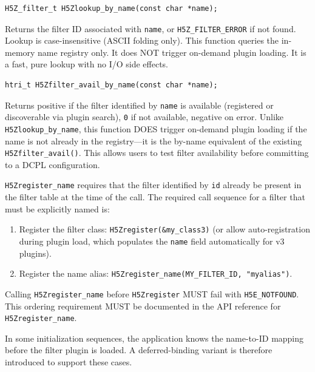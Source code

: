 \documentclass[../HDF5_RFC.tex]{subfiles}
\begin{document}
\begin{verbatim}
H5Z_filter_t H5Zlookup_by_name(const char *name);
\end{verbatim}

Returns the filter ID associated with \texttt{name}, or \texttt{H5Z\_FILTER\_ERROR} if not
found. Lookup is case-insensitive (ASCII folding only). This function queries
the in-memory name registry only. It does NOT trigger on-demand plugin
loading. It is a fast, pure lookup with no I/O side effects.

\begin{verbatim}
htri_t H5Zfilter_avail_by_name(const char *name);
\end{verbatim}

Returns positive if the filter identified by \texttt{name} is available (registered
or discoverable via plugin search), \texttt{0} if not available, negative on error.
Unlike \texttt{H5Zlookup\_by\_name}, this function DOES trigger on-demand plugin
loading if the name is not already in the registry---it is the by-name
equivalent of the existing \texttt{H5Zfilter\_avail()}. This allows users to test
filter availability before committing to a DCPL configuration.

\label{sec:preregister-name}

\texttt{H5Zregister\_name} requires that the filter identified by \texttt{id} already be
present in the filter table at the time of the call. The required call
sequence for a filter that must be explicitly named is:

\begin{enumerate}
\item Register the filter class: \texttt{H5Zregister(\&my\_class3)} (or allow
  auto-registration during plugin load, which populates the \texttt{name} field
  automatically for v3 plugins).
\item Register the name alias: \texttt{H5Zregister\_name(MY\_FILTER\_ID, "myalias")}.
\end{enumerate}

Calling \texttt{H5Zregister\_name} before \texttt{H5Zregister} MUST fail with
\texttt{H5E\_NOTFOUND}. This ordering requirement MUST be documented in the API
reference for \texttt{H5Zregister\_name}.

In some initialization sequences, the application knows the name-to-ID
mapping before the filter plugin is loaded. A deferred-binding variant is
therefore introduced to support these cases.
\end{document}
